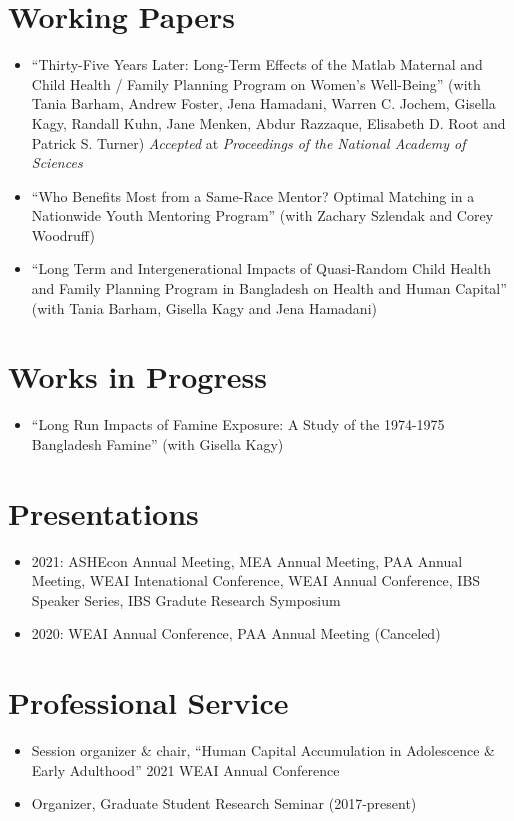 \documentclass[letterpaper]{article}
\begin{document}
\section*{Working Papers}
\begin{itemize}
	\item ``Thirty-Five Years Later: Long-Term Effects of the Matlab Maternal and Child Health / Family Planning Program on Women's Well-Being'' (with Tania Barham, Andrew Foster, Jena Hamadani, Warren C. Jochem, Gisella Kagy, Randall Kuhn, Jane Menken, Abdur Razzaque, Elisabeth D. Root and Patrick S. Turner) \textit{Accepted} at \textit{Proceedings of the National Academy of Sciences}
	\item ``Who Benefits Most from a Same-Race Mentor? Optimal Matching in a Nationwide Youth Mentoring Program'' (with Zachary Szlendak and Corey Woodruff)
	\item ``Long Term and Intergenerational Impacts of Quasi-Random Child Health and Family Planning Program in Bangladesh on Health and Human Capital'' (with Tania Barham, Gisella Kagy and Jena Hamadani)
	
\end{itemize}

\section*{Works in Progress}
\begin{itemize}
	\item ``Long Run Impacts of Famine Exposure: A Study of the 1974-1975 Bangladesh Famine'' (with Gisella Kagy)
\end{itemize}

\section*{Presentations}
\begin{itemize}
	\item[] 2021: ASHEcon Annual Meeting, MEA Annual Meeting, PAA Annual Meeting, WEAI Intenational Conference, WEAI Annual Conference, IBS Speaker Series, IBS Gradute Research Symposium
	\item[] 2020: WEAI Annual Conference, PAA Annual Meeting (Canceled)
\end{itemize}

\section*{Professional Service}
\begin{itemize}
	\item[] Session organizer \& chair, ``Human Capital Accumulation in Adolescence \& Early Adulthood'' 2021 WEAI Annual Conference 
	\item[] Organizer, Graduate Student Research Seminar (2017-present)
\end{itemize}
\end{document}
